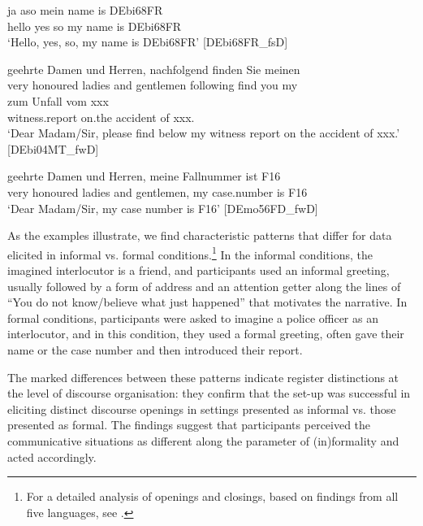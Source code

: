 \documentclass[output=paper,colorlinks,citecolor=brown]{langscibook}
\begin{document}
\ea\label{ex:ch1:ex6} 

 {ja} {aso} {mein} {name} {is} DEbi68FR\\
hello yes so my name is DEbi68FR \\
\trans `Hello, yes, so, my name is DEbi68FR' \hspace{\fill}[DEbi68FR\_fsD]

\z

\ea\label{ex:ch1:ex7}

 {geehrte} {Damen} {und} {Herren,} {nachfolgend} {finden} {Sie} {meinen}  \\
very honoured ladies and gentlemen following find you my \\
\sn {} {zum} {Unfall} {vom} {xxx} \\
witness.report on.the accident of xxx. \\
\trans `Dear Madam/Sir, please find below my witness report on the accident of xxx.' \hspace{\fill} [DEbi04MT\_fwD]

\z

\ea\label{ex:ch1:ex8} 

 {geehrte} {Damen} {und} {Herren,} {meine} {Fallnummer} {ist} {F16}\\
very honoured ladies and gentlemen, my case.number is F16 \\
\trans `Dear Madam/Sir, my case number is F16' \hspace{\fill}[DEmo56FD\_fwD]

\z

As the examples illustrate, we find characteristic patterns that differ for data elicited in informal vs. formal conditions.\footnote{For a detailed analysis of openings and closings, based on findings from all five languages, see .} In the informal conditions, the imagined interlocutor is a friend, and participants used an informal greeting, usually followed by a form of address and an attention getter along the lines of “You do not know\slash believe what just happened” that motivates the narrative. In formal conditions, participants were asked to imagine a police officer as an interlocutor, and in this condition, they used a formal greeting, often gave their name or the case number and then introduced their report.

The marked differences between these patterns indicate register distinctions at the level of discourse organisation: they confirm that the set-up was successful in eliciting distinct discourse openings in settings presented as informal vs. those presented as formal. The findings suggest that participants perceived the communicative situations as different along the parameter of (in)formality and acted accordingly.
\end{document}

